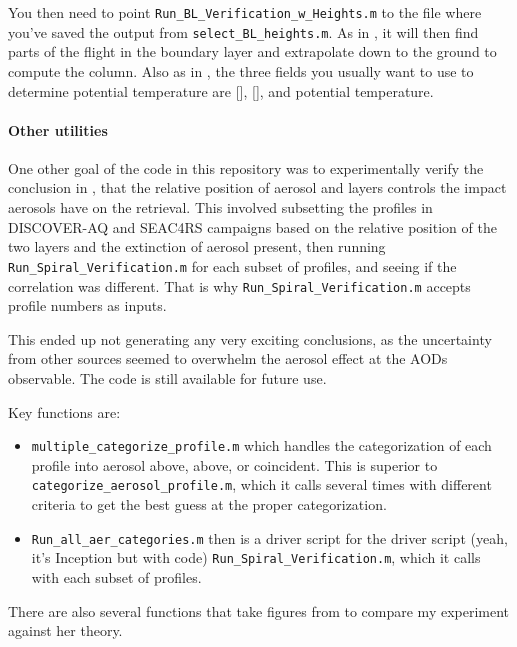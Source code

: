 \documentclass[12pt]{article}
\begin{document}
		You then need to point \lstinline$Run_BL_Verification_w_Heights.m$ to the file where you've saved the output from \lstinline$select_BL_heights.m$. As in \citet{russell11}, it will then find parts of the flight in the boundary layer and extrapolate down to the ground to compute the column. Also as in \citet{russell11}, the three fields you usually want to use to determine potential temperature are [], [], and potential temperature.
		
		\paragraph{Other utilities}
		
		One other goal of the code in this repository was to experimentally verify the conclusion in \citet{bousserez14}, that the relative position of aerosol and  layers controls the impact aerosols have on the  retrieval.  This involved subsetting the profiles in DISCOVER-AQ and SEAC4RS campaigns based on the relative position of the two layers and the extinction of aerosol present, then running \lstinline$Run_Spiral_Verification.m$ for each subset of profiles, and seeing if the correlation was different. That is why \lstinline$Run_Spiral_Verification.m$ accepts profile numbers as inputs.
		
		This ended up not generating any very exciting conclusions, as the uncertainty from other sources seemed to overwhelm the aerosol effect at the AODs observable. The code is still available for future use.
		
		Key functions are:
		\begin{itemize}
		\item \lstinline$multiple_categorize_profile.m$ which handles the categorization of each profile into aerosol above,  above, or coincident. This is superior to \lstinline$categorize_aerosol_profile.m$, which it calls several times with different criteria to get the best guess at the proper categorization.
		
		\item \lstinline$Run_all_aer_categories.m$ then is a driver script for the driver script (yeah, it's Inception but with code) \lstinline$Run_Spiral_Verification.m$, which it calls with each subset of profiles.
		\end{itemize}
		
		There are also several functions that take figures from \citet{leitao10} to compare my experiment against her theory.
		
\end{document}
